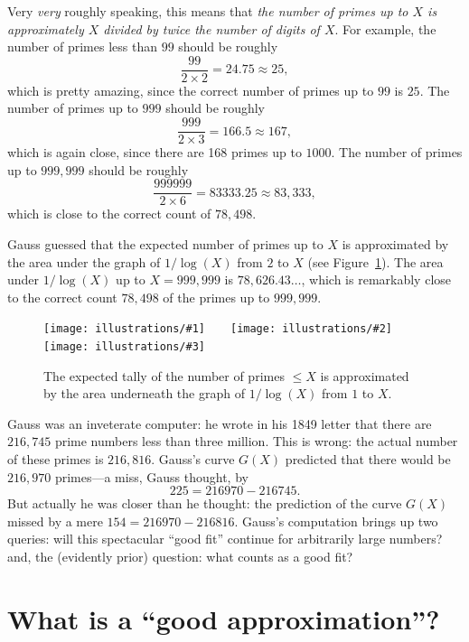 \documentclass[openany]{book}
\newcommand{\illthree}[5]{%
   \begin{figure}[H]%
\centering%
   \texttt{[image: illustrations/\#1]}$\qquad$\texttt{[image: illustrations/\#2]}$\qquad$\texttt{[image: illustrations/\#3]}%
   \caption{#5}%
    \end{figure}}
\theoremstyle{plain}
\theoremstyle{definition}
\begin{document}
 Very {\em very} roughly speaking, this
means that {\em the number of primes up to $X$ is approximately $X$ divided by
twice the number of digits of $X$}.  For example,
the number of primes less than $99$ should be roughly
$$
   \frac{99}{2\times 2} = 24.75 \approx  25,
$$
which is pretty amazing, since the correct number of
primes up to $99$ is $25$.  The number of primes up to $999$ should
be roughly
$$
   \frac{999}{2\times 3} = 166.5 \approx  167,
$$
which is again close, since there are 168 primes up to $1000$.
The number of primes up to $999{,}999$ should be roughly
$$
   \frac{999999}{2\times 6} = 83333.25 \approx  83{,}333,
$$
which is close to the correct count of $78{,}498$.

Gauss guessed that the expected number of primes up to $X$
is approximated by the area under the
graph of $1/\log(X)$ from $2$ to $X$ (see Figure~\ref{fig:G}).
The area under $1/\log(X)$ up to $X=999{,}999$ is $78{,}626.43\ldots$, which
is remarkably close to the correct count $78{,}498$ of the primes
up to $999{,}999$.

\illthree{area_under_log_graph_30}{area_under_log_graph_100}{area_under_log_graph_1000}{.27}{The
  expected tally of the number of primes $\leq X$ is approximated by the
  area underneath the graph of $1/\log(X)$ from $1$ to $X$.\label{fig:G}}


Gauss was an inveterate computer:
he wrote in his 1849 letter  that
there are $216{,}745$ prime numbers less than three million.  This is
wrong: the actual number of these primes is $216{,}816$. Gauss's curve $G(X)$
predicted that there would be $216{,}970$ primes---a miss, Gauss
thought, by
$$225 = 216970 - 216745.$$
But actually he was closer than he thought: the
prediction of the curve $G(X)$ missed by a mere $154 = 216970  - 216816$.
Gauss's computation brings up two queries: will this spectacular ``good
fit'' continue for arbitrarily large numbers? and, the (evidently
prior) question: what counts as a good fit?



\chapter{What is a ``good approximation''?}\label{sec:sqrterror}
\end{document}
